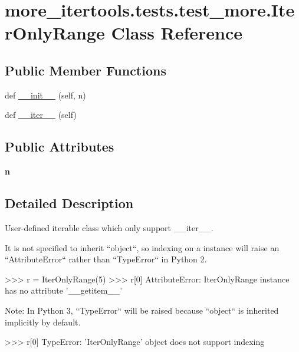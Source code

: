 \hypertarget{classmore__itertools_1_1tests_1_1test__more_1_1_iter_only_range}{}\section{more\+\_\+itertools.\+tests.\+test\+\_\+more.\+Iter\+Only\+Range Class Reference}
\label{classmore__itertools_1_1tests_1_1test__more_1_1_iter_only_range}
\subsection*{Public Member Functions}
\begin{DoxyCompactItemize}
\item 
def \hyperlink{classmore__itertools_1_1tests_1_1test__more_1_1_iter_only_range_ae98cee0cc33c8665d432c97a1720b3fa}{\+\_\+\+\_\+init\+\_\+\+\_\+} (self, n)
\item 
def \hyperlink{classmore__itertools_1_1tests_1_1test__more_1_1_iter_only_range_aa6ac9b01cb131d745b4d62d286a89ddf}{\+\_\+\+\_\+iter\+\_\+\+\_\+} (self)
\end{DoxyCompactItemize}
\subsection*{Public Attributes}
\begin{DoxyCompactItemize}
\item 
\mbox{\label{classmore__itertools_1_1tests_1_1test__more_1_1_iter_only_range_a8e1fb21052d004a1cdf4631e3573bd3f}} 
{\bfseries n}
\end{DoxyCompactItemize}


\subsection{Detailed Description}
\begin{DoxyVerb}User-defined iterable class which only support __iter__.

It is not specified to inherit ``object``, so indexing on a instance will
raise an ``AttributeError`` rather than ``TypeError`` in Python 2.

>>> r = IterOnlyRange(5)
>>> r[0]
AttributeError: IterOnlyRange instance has no attribute '__getitem__'

Note: In Python 3, ``TypeError`` will be raised because ``object`` is
inherited implicitly by default.

>>> r[0]
TypeError: 'IterOnlyRange' object does not support indexing
\end{DoxyVerb}
 

